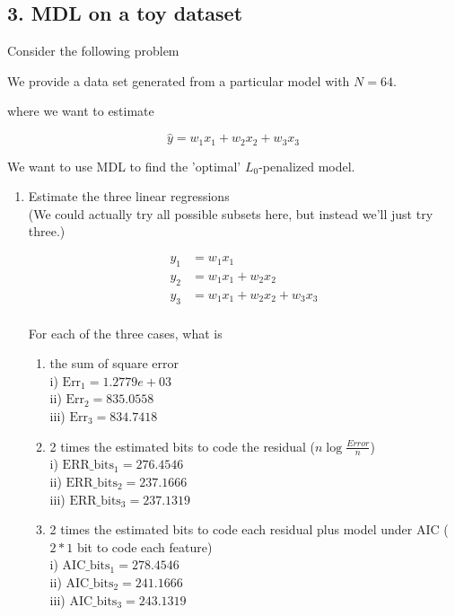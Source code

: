 \documentclass[english]{article}
\begin{document}
\subsection*{3. MDL on a toy dataset}

Consider the following problem

 We provide a data set generated from a particular model with $N=64$.

where we want to estimate

\begin{equation*}
 \hat{y} =  w_1 x_1 + w_2 x_2 + w_3 x_3 
\end{equation*}

We want to use MDL to find the 'optimal' $L_0$-penalized model.

\begin{enumerate}
\item  Estimate the three linear regressions \\

(We could actually try all possible subsets here, but instead we'll just try three.)

\begin{align*}
  y_1& = w_1 x_1 \\
  y_2& = w_1 x_1 + w_2 x_2 \\
  y_3& = w_1 x_1 + w_2 x_2 + w_3 x_3  \\
\end{align*}

For each of the three cases, what is
\begin{enumerate}
\item the sum of square error \\
i)   $\text{Err}_1 = 1.2779e+03 $ \\
ii)  $\text{Err}_2 =  835.0558$\\
iii) $\text{Err}_3 = 834.7418$\\

\item 2 times the estimated bits to code the residual ($n \log{\frac{Error}{n}} $)  \\
i)    $\text{ERR}\_\text{bits}_1 = 276.4546 $ \\
ii)   $\text{ERR}\_\text{bits}_2 = 237.1666$ \\
iii)  $\text{ERR}\_\text{bits}_3 = 237.1319$ \\

\item 2 times the estimated bits to code each residual plus model under AIC ($2*1$ bit to code each feature) \\
i)    $\text{AIC}\_\text{bits}_1 = 278.4546$ \\
ii)   $\text{AIC}\_\text{bits}_2 = 241.1666$ \\
iii)  $\text{AIC}\_\text{bits}_3 = 243.1319$ \\


\end{enumerate}
\end{enumerate}
\end{document}

